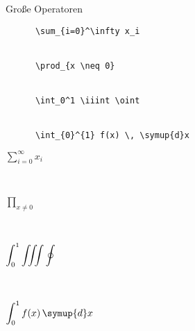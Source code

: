 \begin{frame}[fragile]{Große Operatoren}
  \begin{CodeExample}{0.65}
    \vspace{\baselineskip}
    \begin{verbatim}
      \sum_{i=0}^\infty x_i


      \prod_{x \neq 0}


      \int_0^1 \iiint \oint


      \int_{0}^{1} f(x) \, \symup{d}x

    \end{verbatim}
  \CodeResult
  \begin{minipage}[c][3\baselineskip][c]{0.9\textwidth}
      $\displaystyle \sum_{i=0}^\infty x_i$
    \end{minipage} \\\nointerlineskip
    \begin{minipage}[c][3\baselineskip][c]{\textwidth}
      $\displaystyle \prod_{x \neq 0}$
    \end{minipage} \\\nointerlineskip
    \begin{minipage}[c][3\baselineskip][c]{\textwidth}
      $\displaystyle \smash{\int_0^1} \iiint \oint$
    \end{minipage} \\\nointerlineskip
    \begin{minipage}[c][3\baselineskip][c]{\textwidth}
      $\displaystyle \int_{0}^{1} f(x) \, \symup{d}x $
    \end{minipage}
  \end{CodeExample}
\end{frame}

